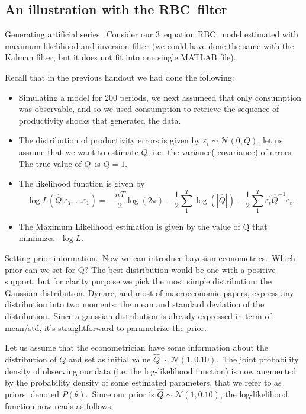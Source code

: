 \documentclass[a4paper,12pt]{article}%
\begin{document}
\subsection{An illustration with the RBC\ filter}

\textsf{Generating artificial series.\ }Consider our 3\ equation RBC\ model
estimated with maximum likelihood and inversion filter (we could have done the
same with the Kalman filter, but it does not fit into one single MATLAB file).

Recall that in the previous handout we had done the following:

\begin{itemize}
\item Simulating a model for 200 periods, we next assumeed that only
consumption was observable, and so we used consumption to retrieve the
sequence of productivity shocks that generated the data.

\item The distribution of productivity errors is given by $\varepsilon_{t}%
\sim\mathcal{N}(0,Q)$, let us assume that we want to estimate $Q$, i.e.\ the
variance(-covariance) of errors. The true value of \underline{$Q$\ is $Q=1$}.

\item The likelihood function is given by
\[
\log L(\hat{Q}|\varepsilon_{T},...\varepsilon_{1})=-\frac{nT}{2}\log
(2\pi)-\frac{1}{2}\sum_{1}^{T}\log\left(  |\hat{Q}|\right)  -\frac{1}{2}%
\sum_{1}^{T}\varepsilon_{t}^{\prime}\hat{Q}^{-1}\varepsilon_{t}.
\]


\item The Maximum Likelihood estimation is given by the value of Q that
minimizes -$\log L$.
\end{itemize}

\textsf{Setting prior information.\ }Now we can introduce bayesian
econometrics.\ Which prior can we set for Q? The best distribution would be
one with a positive support, but for clarity purpose we pick the most simple
distribution: the Gaussian distribution. Dynare, and most of macroeconomic
papers, express any distribution into two moments: the mean and standard
deviation of the distribution.\ Since a gaussian distribution is already
expressed in term of mean/std, it's straightforward to parametrize the prior.\ 

Let us assume that the econometrician have some information about the
distribution of $Q$ and set as initial value $\hat{Q}\sim\mathcal{N}%
(1,0.10)$.\ The joint probability density of observing our data (i.e. the
log-likelihood function) is now augmented by the probability density of some
estimated parameters, that we refer to as priors, denoted $P\left(
\theta\right)  $.\ Since our prior is $\hat{Q}\sim\mathcal{N}(1,0.10)$, the
log-likelihood function now reads as follows:%
\end{document}

